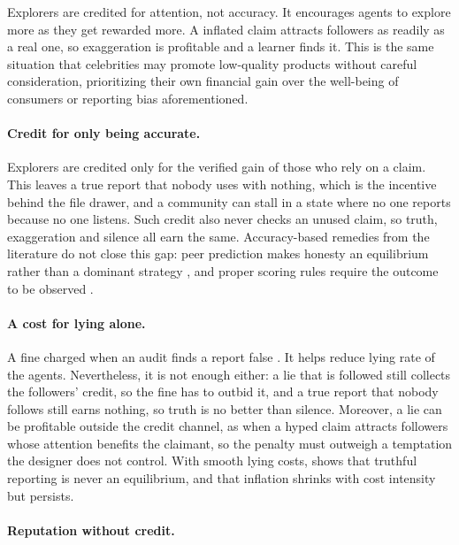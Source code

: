 Explorers are credited for attention, not accuracy. It encourages agents to explore
more as they get rewarded more. A inflated claim attracts followers as readily as a real one, so exaggeration is profitable and a learner finds it. This is the same situation that celebrities may promote low-quality products without careful consideration, prioritizing their own financial gain over the well-being of consumers or reporting bias aforementioned.

\paragraph{Credit for only being accurate.}

Explorers are credited only for the verified gain of those who rely on a claim. This
leaves a true report that nobody uses with nothing, which is the incentive
behind the file drawer, and a community can stall in a state where no one
reports because no one listens. Such credit also never checks an unused claim,
so truth, exaggeration and silence all earn the same. Accuracy-based remedies
from the literature do not close this gap: peer prediction makes honesty an
equilibrium rather than a dominant strategy \citep{miller2005peer}, and proper
scoring rules require the outcome to be observed \citep{gneiting2007strictly}.

\paragraph{A cost for lying alone.}

A fine charged when an audit finds a report false \citep{becker1968crime}. It
helps reduce lying rate of the agents. Nevertheless, it is not enough either: a
lie that is followed still collects the followers' credit, so the fine has to
outbid it, and a true report that nobody follows still earns nothing, so truth
is no better than silence. Moreover, a lie can be profitable outside the credit channel,
as when a hyped claim attracts followers whose attention benefits the claimant,
so the penalty must outweigh a temptation the designer does not control. With
smooth lying costs, \citep{kartik2009StrategicCommunicationLying} shows that
truthful reporting is never an equilibrium, and that inflation shrinks with cost
intensity but persists.

\paragraph{Reputation without credit.}

